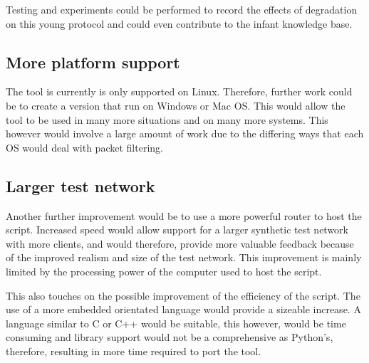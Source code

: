Testing and experiments could be performed to record the effects of degradation on this young protocol and could even contribute to the infant knowledge base.


\subsection{More platform support}
The tool is currently is only supported on Linux. Therefore, further work could be to create a version that run on Windows or Mac OS. This would allow the tool to be used in many more situations and on many more systems. This however would involve a large amount of work due to the differing ways that each OS would deal with packet filtering.


\subsection{Larger test network}
Another further improvement would be to use a more powerful router to host the script. Increased speed would allow support for a larger synthetic test network with more clients, and would therefore, provide more valuable feedback because of the improved realism and size of the test network. This improvement is mainly limited by the processing power of the computer used to host the script. 

This also touches on the possible improvement of the efficiency of the script. The use of a more embedded orientated language would provide a sizeable increase. A language similar to C or C++ would be suitable, this however, would be time consuming and library support would not be a comprehensive as Python's, therefore, resulting in more time required to port the tool.